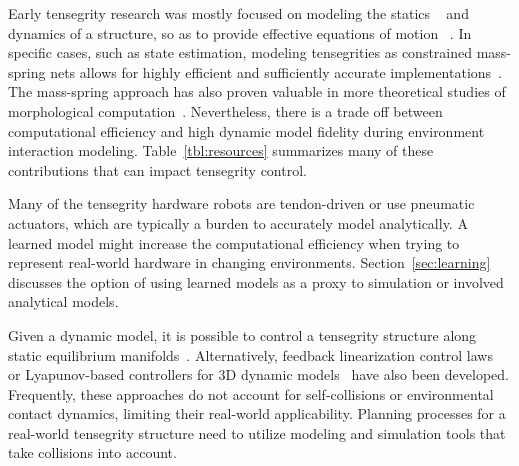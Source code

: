 Early tensegrity research was mostly focused on modeling the statics
~\cite{2003Tensegrity:-Str, Juan2008, Arsenault:2008bh} and dynamics
of a structure, so as to provide effective equations of motion
~\cite{Kanchanasaratool2002Motion-Control-, De-Oliveira:2006ys,
skelton_tensegrity_2009}.  In specific cases, such as state
estimation, modeling tensegrities as constrained mass-spring nets
allows for highly efficient and sufficiently accurate
implementations~\cite{Caluwaerts:2015aa}.  The mass-spring approach
has also proven valuable in more theoretical studies of morphological
computation~\cite{Hauser}. Nevertheless, there is a trade off between
computational efficiency and high dynamic model fidelity during
environment interaction modeling.  Table~\ref{tbl:resources}
summarizes many of these contributions that can impact tensegrity
control.



Many of the tensegrity hardware robots are tendon-driven or use
pneumatic actuators, which are typically a burden to accurately model
analytically. A learned model might increase the computational
efficiency when trying to represent real-world hardware in changing
environments.  Section~\ref{sec:learning} discusses the option of
using learned models as a proxy to simulation or involved analytical
models.


Given a dynamic model, it is possible to control a tensegrity
structure along static equilibrium
manifolds~\cite{Skelton1997Controllable-Te}.  Alternatively, feedback
linearization control laws~\cite{Aldrich2003Control-Synthes} or
Lyapunov-based controllers for 3D dynamic
models~\cite{Wroldsen2006A-Discussion-on} have also been
developed. Frequently, these approaches do not account for
self-collisions or environmental contact dynamics, limiting their
real-world applicability.  Planning processes for a real-world
tensegrity structure need to utilize modeling and simulation tools
that take collisions into account.


